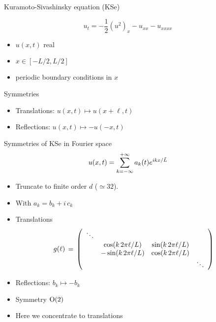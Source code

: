 \begin{frame}{Kuramoto-Sivashinsky equation (KSe)}
 \begin{block}{}
  \[
	u_t =  -{\textstyle\frac{1}{2}}(u^2)_x-u_{xx}-u_{xxxx}
  \]
  \begin{itemize}
    \item $u(x,t)$ real
	\item $x\in[-L/2,L/2]$
	\item periodic boundary conditions in $x$
  \end{itemize}
 \end{block}
  \begin{block}{Symmetries}
    \begin{itemize}
	  \item Translations: $u(x,t) \mapsto u(x+\ell,t)$
	  \item Reflections: $u(x,t) \mapsto -u(-x,t)$
    \end{itemize}

  \end{block}
\end{frame}

\begin{frame}{Symmetries of KSe in Fourier space}
\[
    u(x,t)=\sum_{k=-\infty}^{+\infty} a_k (t) e^{ i k x /\tildeL }
\]
\begin{itemize}
  \item Truncate to finite order $d$ ($\simeq32$).
  \item With $a_k=b_k+i\,c_k$
  \item Translations  
  \[
  \LieEl(\ell) \,=\,  \left(\barr{cccc}
  \ddots & & &  \\
  &  \cos (k\, 2\pi\ell/L)  & \sin (k\, 2\pi\ell/L) &  \\
  & -\sin (k\, 2\pi\ell/L)  & \cos (k\, 2\pi\ell/L) &  \\
  & & & \ddots  
      \earr\right)
  \] %
  \item Reflections: $b_k\mapsto -b_k$
  \item Symmetry $\On{2}$
  \item Here we concentrate to translations
\end{itemize}
\end{frame}

